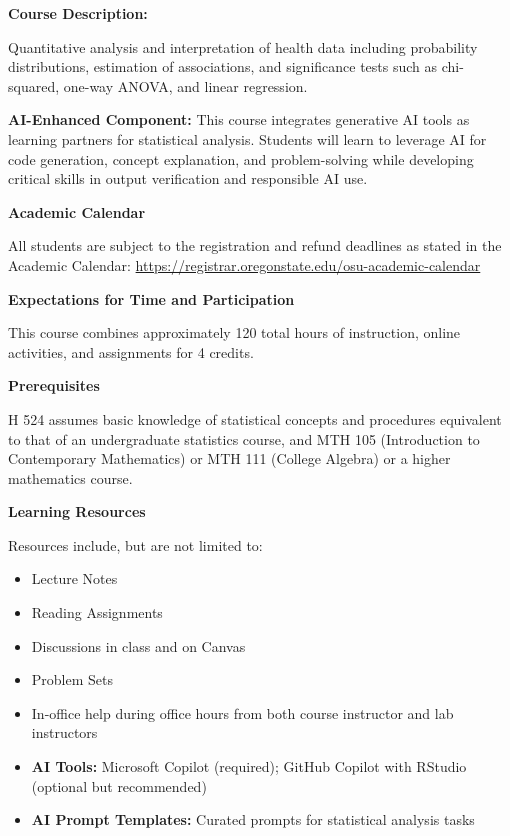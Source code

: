 \documentclass[11pt]{article}
\begin{document}
\noindent\textbf{Course Description:}

Quantitative analysis and interpretation of health data including probability distributions, estimation of associations, and significance tests such as chi-squared, one-way ANOVA, and linear regression.

\textbf{\textcolor{aiblue}{AI-Enhanced Component:}} This course integrates generative AI tools as learning partners for statistical analysis. Students will learn to leverage AI for code generation, concept explanation, and problem-solving while developing critical skills in output verification and responsible AI use.

\vspace{8pt}

\noindent\textbf{Academic Calendar}

All students are subject to the registration and refund deadlines as stated in the Academic Calendar: \url{https://registrar.oregonstate.edu/osu-academic-calendar}

\vspace{8pt}

\noindent\textbf{Expectations for Time and Participation}

This course combines approximately 120 total hours of instruction, online activities, and assignments for 4 credits.

\vspace{8pt}

\noindent\textbf{Prerequisites}

H 524 assumes basic knowledge of statistical concepts and procedures equivalent to that of an undergraduate statistics course, and MTH 105 (Introduction to Contemporary Mathematics) or MTH 111 (College Algebra) or a higher mathematics course.

\vspace{8pt}

\noindent\textbf{Learning Resources}

\noindent Resources include, but are not limited to:
\begin{itemize}[leftmargin=20pt]
\item Lecture Notes
\item Reading Assignments
\item Discussions in class and on Canvas
\item Problem Sets
\item In-office help during office hours from both course instructor and lab instructors
\item \textcolor{aiblue}{\textbf{AI Tools:}} Microsoft Copilot (required); GitHub Copilot with RStudio (optional but recommended)
\item \textcolor{aiblue}{\textbf{AI Prompt Templates:}} Curated prompts for statistical analysis tasks
\end{itemize}
\end{document}
